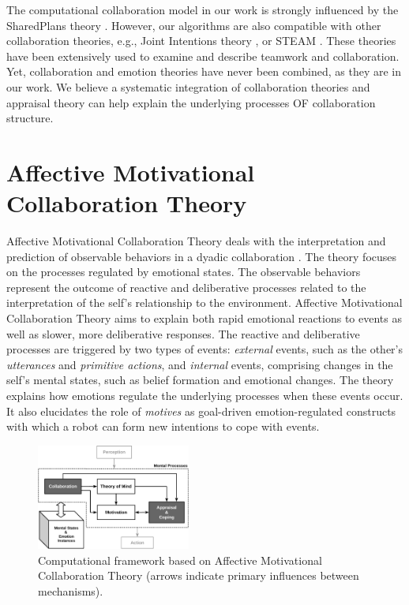\documentclass{article}
\begin{document}
The computational collaboration model in our work is strongly influenced by the
SharedPlans theory \cite{grosz:plans-discourse}. However, our algorithms are
also compatible with other collaboration theories, e.g., Joint Intentions theory
\cite{cohen:teamwork}, or STEAM \cite{tambe:flexible-teamwork}. These theories
have been extensively used to examine and describe teamwork and collaboration.
Yet, collaboration and emotion theories have never been combined, as they are in
our work. We believe a systematic integration of collaboration theories and
appraisal theory can help explain the underlying processes OF collaboration
structure.

\section{{\fontsize{11.85}{12}\selectfont Affective Motivational Collaboration
Theory}}

Affective Motivational Collaboration Theory deals with the interpretation and
prediction of observable behaviors in a dyadic collaboration
\cite{shayganfar:appraisal-short}. The theory focuses on the processes regulated
by emotional states. The observable behaviors represent the outcome of reactive
and deliberative processes related to the interpretation of the self's
relationship to the environment. Affective Motivational Collaboration Theory
aims to explain both rapid emotional reactions to events as well as slower, more
deliberative responses. The reactive and deliberative processes are triggered by
two types of events: \textit{external} events, such as the other's
\textit{utterances} and \textit{primitive actions}, and \textit{internal}
events, comprising changes in the self's mental states, such as belief formation
and emotional changes. The theory explains how emotions regulate the underlying
processes when these events occur. It also elucidates the role of
\textit{motives} as goal-driven emotion-regulated constructs with which a robot
can form new intentions to cope with events.

\vspace*{-3mm}
\begin{figure}[tbh]
  \centering
  \includegraphics[width=0.45\textwidth]{figure/theory-general-croped.pdf}
  \vspace*{-3mm}
  \caption{{\fontsize{9}{9}\selectfont Computational framework based on
  Affective Motivational Collaboration Theory (arrows indicate primary
  influences between mechanisms).}}
  \vspace*{-3mm}
  \label{fig:cpm}
\end{figure}
\end{document}
